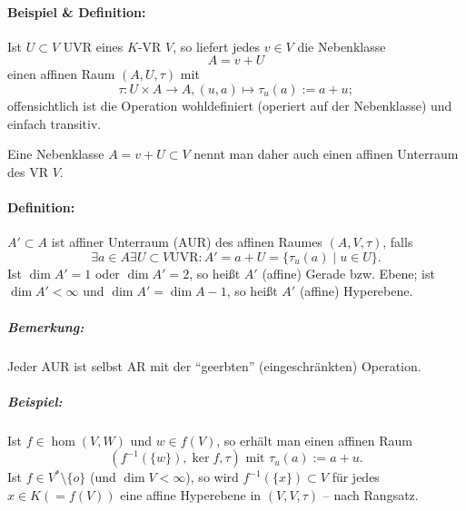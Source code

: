 
\paragraph{Beispiel \& Definition: }
	Ist $ U\subset V $ UVR eines $ K $-VR $ V $, so liefert jedes $ v\in V $ die Nebenklasse
		\[ A = v+U \]
	einen affinen Raum $ (A,U,\tau) $ mit 
		\[ \tau:U\times A\to A,(u,a)\mapsto \tau_u(a):= a+u; \]
	offensichtlich ist die Operation wohldefiniert (operiert auf der Nebenklasse) und einfach transitiv.
	
	Eine Nebenklasse $ A= v+U\subset V $ nennt man daher auch einen affinen Unterraum des VR $ V $.
\paragraph{Definition: }
	$ A'\subset A $ ist affiner Unterraum (AUR) des affinen Raumes $ (A,V,\tau) $, falls
		\[ \exists a\in A\exists U\subset V \text{UVR}:A' = a+U = \{\tau_u(a)\mid u\in U\}.\]
	Ist $ \dim A' =1 $ oder $ \dim A' = 2 $, so heißt $ A' $ (affine) Gerade bzw. Ebene; ist $ \dim A' < \infty $ und $ \dim A' = \dim A-1 $, so heißt $ A' $ (affine) Hyperebene.
\subparagraph{Bemerkung: }
	Jeder AUR ist selbst AR mit der "`geerbten"' (eingeschränkten) Operation.
\subparagraph{Beispiel: }
	Ist $ f\in \hom(V,W) $ und $ w\in f(V) $, so erhält man einen affinen Raum
		\[ (f^{-1}(\{w\}),\ker f,\tau) \text{ mit }\tau_u(a):= a+u.\]
	Ist $ f\in V^*\setminus \{o\} $ (und $ \dim V<\infty $), so wird $ f^{-1}(\{x\})\subset V $ für jedes $ x\in K (=f(V)) $ eine affine Hyperebene in $ (V,V,\tau) $ -- nach Rangsatz.
	

